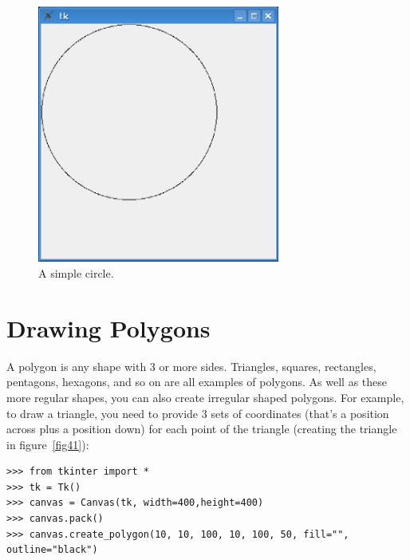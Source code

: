 \begin{figure}
\begin{center}
\includegraphics[width=80mm]{eps/figure40.eps}
\end{center}
\caption{A simple circle.}\label{fig40}
\end{figure}

\section{Drawing Polygons}

A polygon is any shape with 3 or more sides. Triangles, squares, rectangles, pentagons, hexagons, and so on are all examples of polygons. As well as these more regular shapes, you can also create irregular shaped polygons. For example, to draw a triangle, you need to provide 3 sets of coordinates (that's a position across plus a position down) for each point of the triangle (creating the triangle in figure~\ref{fig41}):

\begin{listing}
\begin{verbatim}
>>> from tkinter import *
>>> tk = Tk()
>>> canvas = Canvas(tk, width=400,height=400)
>>> canvas.pack()
>>> canvas.create_polygon(10, 10, 100, 10, 100, 50, fill="", outline="black")
\end{verbatim}
\end{listing}

